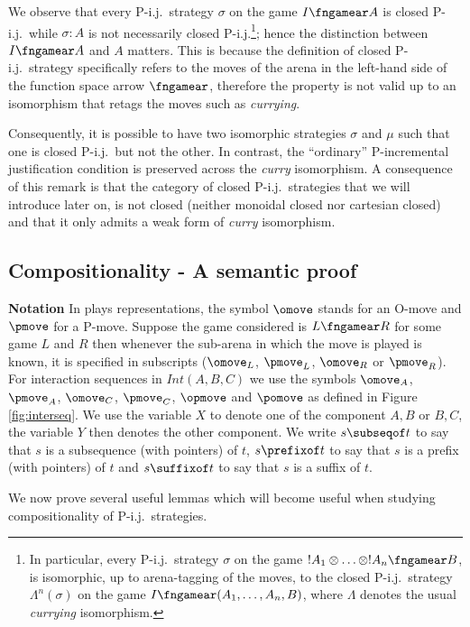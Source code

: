 We observe that every P-i.j.\ strategy $\sigma$ on the game $I
\fngamear A$ is closed P-i.j.\ while $\sigma : A$ is not necessarily closed P-i.j.\footnote{In particular, every P-i.j.\ strategy
$\sigma$ on the game $!A_1 \otimes \ldots \otimes !A_n \fngamear B$,
is isomorphic, up to arena-tagging of the moves, to the closed
P-i.j.\ strategy $\Lambda^n(\sigma)$ on the game $I \fngamear
(A_1,\ldots,A_n,B)$, where $\Lambda$ denotes the usual {\it
currying} isomorphism.};
hence the distinction between $I \fngamear A$ and $A$ matters.
This is because the definition of closed P-i.j.\ strategy
specifically refers to the moves of  the arena in the left-hand side
of the function space arrow $\fngamear$, therefore the property is not valid
up to an isomorphism that retags the moves such as {\it
currying}.

Consequently, it is possible to have two isomorphic strategies $\sigma$ and
$\mu$ such that one is closed P-i.j.\ but not the other. In contrast, the ``ordinary'' P-incremental
justification condition is preserved across the  {\it curry} isomorphism. A consequence of this remark is that the category of closed P-i.j.\ strategies
that we will introduce later on, is not closed (neither monoidal closed nor cartesian closed) and
that it only admits a weak form of {\it curry} isomorphism.

\subsection{Compositionality - A semantic proof}

{\bf Notation} In plays representations, the symbol $\omove$ stands
for an O-move and $\pmove$ for a P-move. Suppose the game considered
is $L\fngamear R$ for some game $L$ and $R$ then whenever the
sub-arena in which the move is played is known, it is specified in
subscripts ($\omove_L$, $\pmove_L$, $\omove_R$ or $\pmove_R$). For
interaction sequences in $Int(A,B,C)$ we use the symbols $\omove_A$,
$\pmove_A$, $\omove_C$, $\pmove_C$, $\opmove$ and $\pomove$ as
defined in Figure \ref{fig:interseq}. We use the variable $X$ to
denote one of the component $A,B$ or $B,C$, the variable  $Y$ then
denotes the other component. We write $s \subseqof t$ to say that
$s$ is a subsequence (with pointers) of $t$, $s \prefixof t$ to say
that $s$ is a prefix (with pointers) of $t$ and  $s \suffixof t$ to
say that $s$ is a suffix of $t$.

We now prove several useful lemmas which will become useful when studying compositionality of P-i.j.\ strategies.

